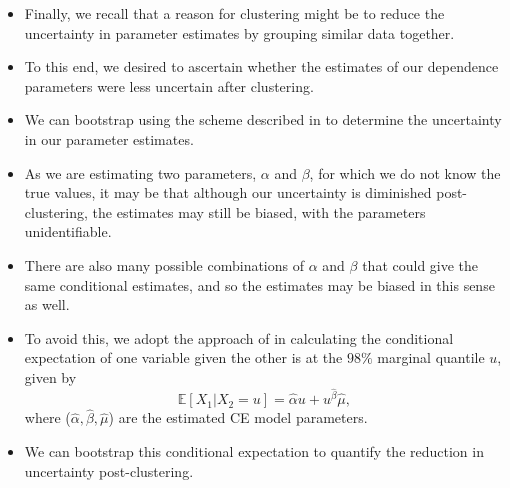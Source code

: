 \documentclass{article}
\numberwithin{equation}{section}
\begin{document}

\begin{itemize}
  \item Finally, we recall that a reason for clustering might be to reduce the uncertainty in parameter estimates by grouping similar data together.
  \item To this end, we desired to ascertain whether the estimates of our dependence parameters were less uncertain after clustering.
  \item We can bootstrap using the scheme described in \cite{Heffernan2004} to determine the uncertainty in our parameter estimates. 
  \item As we are estimating two parameters, $\alpha$ and $\beta$, for which we do not know the true values, it may be that although our uncertainty is diminished post-clustering, the estimates may still be biased, with the parameters unidentifiable.
  \item There are also many possible combinations of $\alpha$ and $\beta$ that could give the same conditional estimates, and so the estimates may be biased in this sense as well.
  \item To avoid this, we adopt the approach of \cite{Richards2021-qm} in calculating the conditional expectation of one variable given the other is at the $98\%$ marginal quantile $u$, given by
  \begin{equation} \label{eq:boot}
    \mathbb{E}[X_1 | X_2 = u] = \hat{\alpha} u + u^{\hat{\beta}} \hat{\mu},
  \end{equation}
  where ($\hat{\alpha}, \hat{\beta}, \hat{\mu}$) are the estimated CE model parameters.
  \item We can bootstrap this conditional expectation to quantify the reduction in uncertainty post-clustering. 
\end{itemize}
\end{document}
